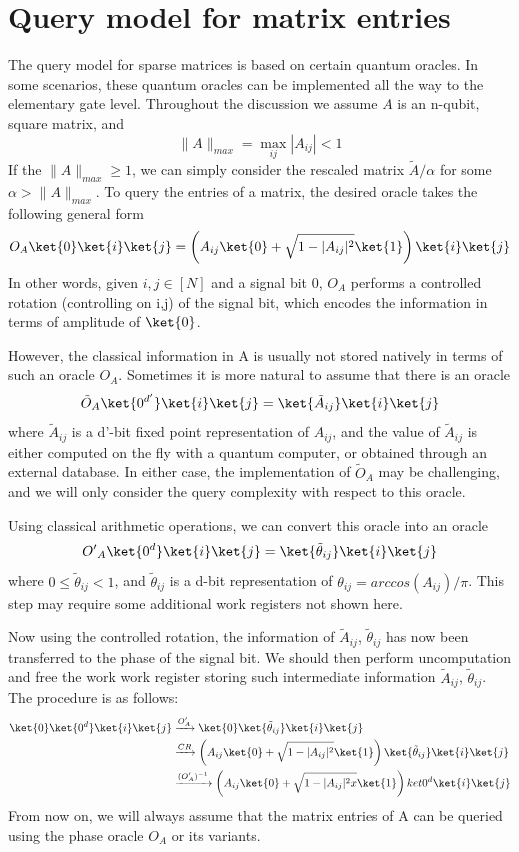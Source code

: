 \documentclass[12pt, oneside]{book}
\theoremstyle{definition}
\theoremstyle{definition}
\theoremstyle{remark}
\begin{document}
\section{Query model for matrix entries}
The query model for sparse matrices is based on certain quantum oracles. In some scenarios, these quantum oracles can be implemented all the way to the elementary gate level. Throughout the discussion we assume $A$ is an n-qubit, square matrix, and 
\[
\|A\|_{max}=\max_{ij}|A_{ij}|<1
\]
If the $\|A\|_{max}\geq 1$, we can simply consider the rescaled matrix $\tilde{A}/\alpha$ for some $\alpha>\|A\|_{max}$. To query the entries of a matrix, the desired oracle takes the following general form
\[
O_A\ket{0}\ket{i}\ket{j}=\left(A_{ij}\ket{0}+\sqrt{1-|A_{ij}|^2}\ket{1}\right)\ket{i}\ket{j}
\]
In other words, given $i,j\in[N]$ and a signal bit $0$, $O_A$ performs a controlled rotation (controlling on i,j) of the signal bit, which encodes the information in terms of amplitude of $\ket{0}$.

However, the classical information in A is usually not stored natively in terms of such an oracle $O_A$. Sometimes it is more natural to assume that there is an oracle
\[
\tilde{O}_A\ket{0^{d'}}\ket{i}\ket{j}=\ket{\tilde{A}_{ij}}\ket{i}\ket{j}
\]
where $\tilde{A}_{ij}$ is a d'-bit fixed point representation of $A_{ij}$, and the value of $\tilde{A}_{ij}$ is either computed on the fly with a quantum computer, or obtained through an external database. In either case, the implementation of $\tilde{O}_A$ may be challenging, and we will only consider the query complexity with respect to this oracle.

Using classical arithmetic operations, we can convert this oracle into an oracle
\[
{O'}_A\ket{0^d}\ket{i}\ket{j}=\ket{\tilde{\theta}_{ij}}\ket{i}\ket{j}
\]
where $0\leq \tilde{\theta}_{ij}<1$, and $\tilde{\theta}_{ij}$ is a d-bit representation of $\theta_{ij}=arccos(A_{ij})/\pi$. This step may require some additional work registers not shown here.

Now using the controlled rotation, the information of $\tilde{A}_{ij}$, $\tilde{\theta}_{ij}$ has now been transferred to the phase of the signal bit. We should then perform uncomputation and free the work work register storing such intermediate information $\tilde{A}_{ij}$, $\tilde{\theta}_{ij}$. The procedure is as follows:
\begin{align*}
\ket{0}\ket{0^d}\ket{i}\ket{j}&\xrightarrow{O'_A}\ket{0}\ket{\tilde{\theta}_{ij}}\ket{i}\ket{j}\\
&\xrightarrow{CR}\left(A_{ij}\ket{0}+\sqrt{1-|A_{ij}|^2}\ket{1}\right)\ket{\tilde{\theta}_{ij}}\ket{i}\ket{j}\\
&\xrightarrow{(O'_A)^{-1}}\left(A_{ij}\ket{0}+\sqrt{1-|A_{ij}|^2x}\ket{1}\right)ket{0^d}\ket{i}\ket{j}
\end{align*}
From now on, we will always assume that the matrix entries of A can be queried using the phase oracle $O_A$ or its variants.
\end{document}
